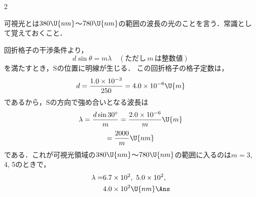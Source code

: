 \begin{multicols}{2}
\begin{sisin}
可視光とは$380\U{nm}$〜$780\U{nm}$の範囲の波長の光のことを言う．常識として覚えておくこと．
\end{sisin}
\KaiHead
\begin{komon}
 回折格子の干渉条件より，
       \[d\sin\theta=m\lambda\quad(ただし\,m\,は整数値)\]
       を満たすとき，$\mathrm{S}$の位置に明線が生じる．\hspace*{\fill}\Ans
{} この回折格子の格子定数は，
       \[d=\frac{1.0\times 10^{-3}}{250}=4.0\times 10^{-6}\U{m}\]
       であるから，$\mathrm{S}$の方向で強め合いとなる波長は
       \[\lambda=\frac{d\sin 30^\circ}{m}=\frac{2.0\times 10^{-6}}{m}\U{m}\]
       \[\hspace*{\fill}=\frac{2000}{m}\U{nm}\]
       である．これが可視光領域の$380\U{nm}$〜$780\U{nm}$の範囲に入るのは$m=3$, 4, 5のときで，
       \[\begin{aligned}
         \lambda=&6.7\times 10^2,\ 5.0\times 10^2,\\
                 &\hspace*{\fill}4.0\times 10^2\U{nm}\Ans
       \end{aligned}\]
\end{komon}


\end{multicols}

